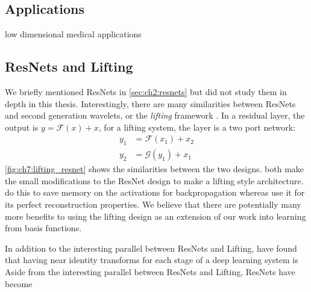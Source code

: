 \subsection{Applications}
low dimensional medical applications
\cite{kang_deep_2017}

\subsection{ResNets and Lifting}
\begin{figure}
  \centering
  \qquad
  \label{fig:ch7:lifting_resnet}
\end{figure}
We briefly mentioned ResNets in \autoref{sec:ch2:resnets} but did not study them
in depth in this thesis. Interestingly, there are many similarities between
ResNets and second generation wavelets, or the \emph{lifting} framework
\cite{sweldens_lifting_1998,daubechies_factoring_1998}.
In a residual layer, the output is $y = \mathcal{F}(x) + x$, for a lifting
system, the layer is a two port network:
\begin{align}
  y_1 &= \mathcal{F}(x_1) + x_2 \\
  y_2 &= \mathcal{G}(y_1) + x_1 
\end{align}
\autoref{fig:ch7:lifting_resnet} shows the similarities between the two designs. 
\cite{gomez_reversible_2017, jacobsen_i-revnet:_2018} both make the small modifications
to the ResNet design to make a lifting style architecture.
\cite{gomez_reversible_2017} do this to save memory on the activations for
backpropagation whereas \cite{jacobsen_i-revnet:_2018} use it for its perfect
reconstruction properties. We believe that there are potentially many more
benefits to using the lifting design as an extension of our work into learning
from basis functions.

In addition to the interesting parallel between ResNets and Lifting,
\citeauthor{bartlett_gradient_2018} have found that having near identity transforms
for each stage of a deep learning system is \cite{bartlett_gradient_2018, bartlett_representing_2018}
Aside from the interesting parallel between ResNets and Lifting, ResNets have
become 
